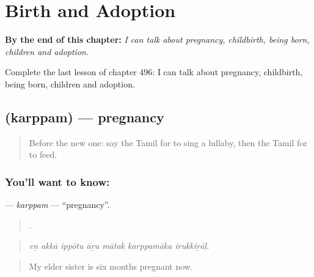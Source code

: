 
\chapter{Birth and Adoption}
\label{ch:ta-birth-and-adoption}

\begin{chapteropening}
\textbf{By the end of this chapter:} \emph{I can talk about pregnancy, childbirth, being born, children and adoption.}

Complete the last lesson of chapter 496: I can talk about pregnancy, childbirth, being born, children and adoption.
\end{chapteropening}

\section[\texorpdfstring{\ta{கர்ப்பம்} (karppam)}{கர்ப்பம் (karppam)}]{ (karppam) — pregnancy}

\label{lesson:TA-C496-karppam}



\begin{quote}
Before the new one: say the Tamil for to sing a lullaby, then the Tamil for to feed.
\end{quote}

\subsection*{You'll want to know: }
\textbf{} — \emph{karppam} — \textquotedblleft{}pregnancy\textquotedblright{}.

\begin{quote}
      .
\end{quote}

\begin{quote}
\emph{eṉ akkā ippōtu āṟu mātak karppamāka irukkiṟāḷ.}
\end{quote}

\begin{quote}
My elder sister is six months pregnant now.
\end{quote}

